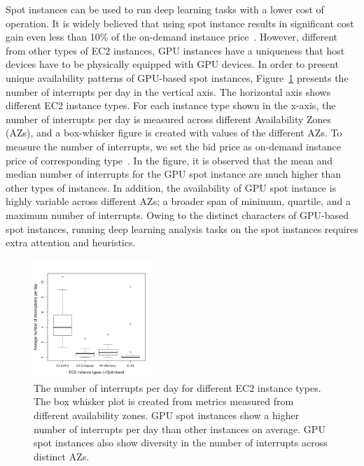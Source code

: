 \documentclass[conference]{IEEEtran}
\begin{document}
Spot instances can be used to run deep learning tasks with a lower cost of operation. It is widely believed that using spot instance results in significant cost gain even less than 10\% of the on-demand instance price~\cite{spot-instance-pricing-analysis}. However, different from other types of EC2 instances, GPU instances have a uniqueness that host devices have to be physically equipped with GPU devices. In order to present unique availability patterns of GPU-based spot instances, Figure~\ref{fig:number-interrupt-bw} presents the number of interrupts per day in the vertical axis. The horizontal axis shows different EC2 instance types. For each instance type shown in the x-axis, the number of interrupts per day is measured across different Availability Zones (AZs), and a box-whisker figure is created with values of the different AZs. To measure the number of interrupts, we set the bid price as on-demand instance price of corresponding type~\cite{not-bid-cloud}. In the figure, it is observed that the mean and median number of interrupts for the GPU spot instance are much higher than other types of instances. In addition, the availability of GPU spot instance is highly variable across different AZs; a broader span of minimum, quartile, and a maximum number of interrupts. Owing to the distinct characters of GPU-based spot instances, running deep learning analysis tasks on the spot instances requires extra attention and heuristics.

\begin{figure}
    \centering\includegraphics[width=0.4\textwidth]{figures/spot-instance-interrupt-bw.pdf}\caption{The number of interrupts per day for different EC2 instance types. The box whisker plot is created from metrics measured from different availability zones. GPU spot instances show a higher number of interrupts per day than other instances on average. GPU spot instances also show diversity in the number of interrupts across distinct AZs.\label{fig:number-interrupt-bw}}
\end{figure}
\end{document}
